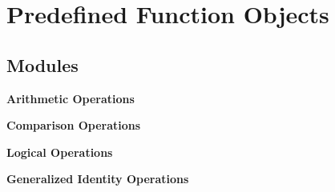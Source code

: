 \section{Predefined Function Objects}
\label{group__predefined__function__objects}
\subsection*{Modules}
\begin{CompactItemize}
\item 
{\bf Arithmetic Operations}
\item 
{\bf Comparison Operations}
\item 
{\bf Logical Operations}
\item 
{\bf Generalized Identity Operations}
\end{CompactItemize}
